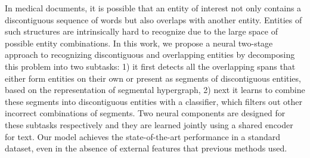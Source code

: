 In medical documents, it is possible that an entity of interest not only contains a discontiguous sequence of words but also overlaps with another entity. Entities of such structures are intrinsically hard to recognize due to the large space of possible entity combinations. In this work, we propose a neural two-stage approach to recognizing discontiguous and overlapping entities by decomposing this problem into two subtasks: 1) it first detects all the overlapping spans that either form entities on their own or present as segments of discontiguous entities, based on the representation of segmental hypergraph, 2) next it learns to combine these segments into discontiguous entities with a classifier, which filters out other incorrect combinations of segments. Two neural components are designed for these subtasks respectively and they are learned jointly using a shared encoder for text. 
Our model achieves the state-of-the-art performance in a standard dataset, even in the absence of external features that previous methods used.